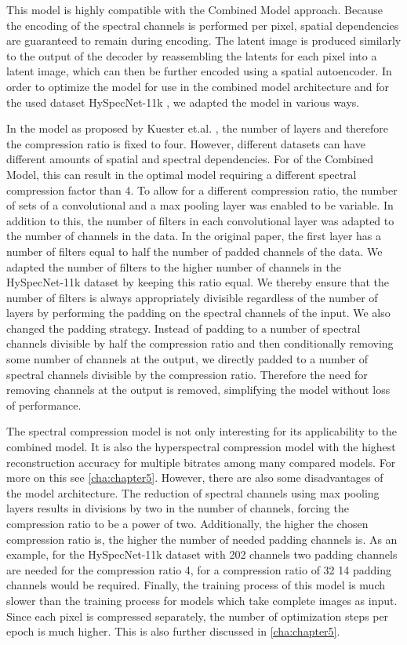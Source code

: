 This model is highly compatible with the Combined Model approach. Because the encoding of the spectral channels is performed per pixel, spatial dependencies are guaranteed to remain during encoding. The latent image is produced similarly to the output of the decoder by reassembling the latents for each pixel into a latent image, which can then be further encoded using a spatial autoencoder. In order to optimize the model for use in the combined model architecture and for the used dataset HySpecNet-11k \citep{fuchs_hyspecnet-11k_2023}, we adapted the model in various ways.

In the model as proposed by Kuester et.al. \citep{kuester_1d-convolutional_2021,kuester_transferability_2022}, the number of layers and therefore the compression ratio is fixed to four. However, different datasets can have different amounts of spatial and spectral dependencies. For of the Combined Model, this can result in the optimal model requiring a different spectral compression factor than 4. To allow for a different compression ratio, the number of sets of a convolutional and a max pooling layer was enabled to be variable. In addition to this, the number of filters in each convolutional layer was adapted to the number of channels in the data. In the original paper, the first layer has a number of filters equal to half the number of padded channels of the data. We adapted the number of filters to the higher number of channels in the HySpecNet-11k dataset by keeping this ratio equal. We thereby ensure that the number of filters is always appropriately divisible regardless of the number of layers by performing the padding on the spectral channels of the input. We also changed the padding strategy. Instead of padding to a number of spectral channels divisible by half the compression ratio and then conditionally removing some number of channels at the output, we directly padded to a number of spectral channels divisible by the compression ratio. Therefore the need for removing channels at the output is removed, simplifying the model without loss of performance.

The spectral compression model is not only interesting for its applicability to the combined model. It is also the hyperspectral compression model with the highest reconstruction accuracy for multiple bitrates among many compared models. For more on this see \autoref{cha:chapter5}. However, there are also some disadvantages of the model architecture. The reduction of spectral channels using max pooling layers results in divisions by two in the number of channels, forcing the compression ratio to be a power of two. Additionally, the higher the chosen compression ratio is, the higher the number of needed padding channels is. As an example, for the HySpecNet-11k dataset with 202 channels two padding channels are needed for the compression ratio 4, for a compression ratio of 32 14 padding channels would be required. Finally, the training process of this model is much slower than the training process for models which take complete images as input. Since each pixel is compressed separately, the number of optimization steps per epoch is much higher. This is also further discussed in \autoref{cha:chapter5}.
